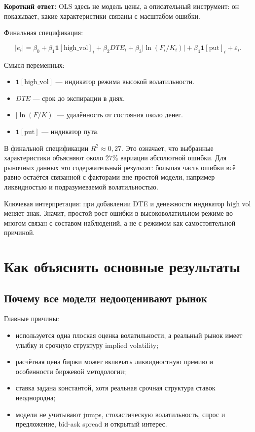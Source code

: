 \documentclass[11pt,a4paper]{article}
\newcommand{\answerbox}[1]{%
  \noindent\colorbox{softblue}{%
    \parbox{\dimexpr\linewidth-2\fboxsep\relax}{\textbf{Короткий ответ:} #1}%
  }\par\vspace{0.2em}
}
\begin{document}
\answerbox{OLS здесь не модель цены, а описательный инструмент: он показывает, какие характеристики связаны с масштабом ошибки.}

Финальная спецификация:

\[
|e_i|=\beta_0+\beta_1\mathbf{1}[\text{high\_vol}]_i+\beta_2DTE_i+\beta_3|\ln(F_i/K_i)|+\beta_4\mathbf{1}[\text{put}]_i+\varepsilon_i.
\]

Смысл переменных:

\begin{itemize}
    \item $\mathbf{1}[\text{high\_vol}]$ --- индикатор режима высокой волатильности.
    \item $DTE$ --- срок до экспирации в днях.
    \item $|\ln(F/K)|$ --- удалённость от состояния около денег.
    \item $\mathbf{1}[\text{put}]$ --- индикатор пута.
\end{itemize}

В финальной спецификации $R^2\approx0{,}27$. Это означает, что выбранные характеристики объясняют около 27\% вариации абсолютной ошибки. Для рыночных данных это содержательный результат: большая часть ошибки всё равно остаётся связанной с факторами вне простой модели, например ликвидностью и подразумеваемой волатильностью.

Ключевая интерпретация: при добавлении DTE и денежности индикатор high vol меняет знак. Значит, простой рост ошибки в высоковолатильном режиме во многом связан с составом наблюдений, а не с режимом как самостоятельной причиной.

\section{Как объяснять основные результаты}

\subsection{Почему все модели недооценивают рынок}

Главные причины:

\begin{itemize}
    \item используется одна плоская оценка волатильности, а реальный рынок имеет улыбку и срочную структуру implied volatility;
    \item расчётная цена биржи может включать ликвидностную премию и особенности биржевой методологии;
    \item ставка задана константой, хотя реальная срочная структура ставок неоднородна;
    \item модели не учитывают jumps, стохастическую волатильность, спрос и предложение, bid-ask spread и открытый интерес.
\end{itemize}
\end{document}
